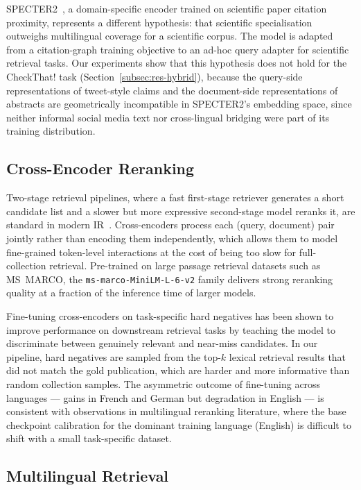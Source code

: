 SPECTER2~\citep{singh2022scirepeval}, a domain-specific encoder trained on scientific paper citation proximity, represents a different hypothesis: that scientific specialisation outweighs multilingual coverage for a scientific corpus. The model is adapted from a citation-graph training objective to an ad-hoc query adapter for scientific retrieval tasks. Our experiments show that this hypothesis does not hold for the CheckThat! task (Section~\ref{subsec:res-hybrid}), because the query-side representations of tweet-style claims and the document-side representations of abstracts are geometrically incompatible in SPECTER2's embedding space, since neither informal social media text nor cross-lingual bridging were part of its training distribution.

\subsection{Cross-Encoder Reranking}

Two-stage retrieval pipelines, where a fast first-stage retriever generates a short candidate list and a slower but more expressive second-stage model reranks it, are standard in modern IR~\citep{ManningEtAl2008}. Cross-encoders process each (query, document) pair jointly rather than encoding them independently, which allows them to model fine-grained token-level interactions at the cost of being too slow for full-collection retrieval. Pre-trained on large passage retrieval datasets such as MS~MARCO, the \texttt{ms-marco-MiniLM-L-6-v2} family delivers strong reranking quality at a fraction of the inference time of larger models.

Fine-tuning cross-encoders on task-specific hard negatives has been shown to improve performance on downstream retrieval tasks by teaching the model to discriminate between genuinely relevant and near-miss candidates. In our pipeline, hard negatives are sampled from the top-$k$ lexical retrieval results that did not match the gold publication, which are harder and more informative than random collection samples. The asymmetric outcome of fine-tuning across languages --- gains in French and German but degradation in English --- is consistent with observations in multilingual reranking literature, where the base checkpoint calibration for the dominant training language (English) is difficult to shift with a small task-specific dataset.

\subsection{Multilingual Retrieval}

